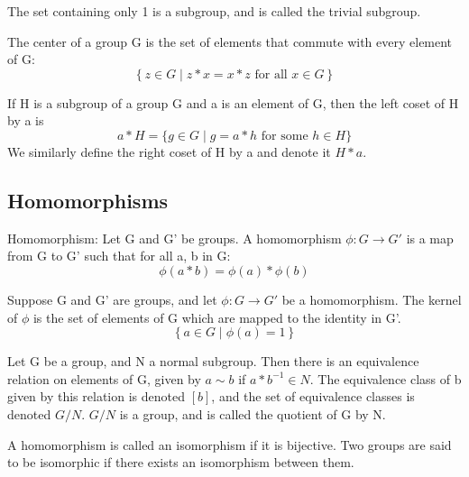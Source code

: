\documentclass[runningheads,a4paper]{llncs}
\renewcommand{\-}{\setminus}
\begin{document}
\begin{definition} The set containing only 1 is a subgroup, and is called the trivial subgroup.
\end{definition}

\begin{definition}[Center]
The center of a group G is the set of elements that commute with every element of G:
\[
\left\{ z \in G \mid z*x = x*z \text{ for all } x \in G \right\}
\]
\end{definition}

\begin{definition}
If H is a subgroup of a group G and a is an element of G, then the left coset of H by a is 
\[
a * H = \{ g \in G \mid g = a * h \text{ for some } h \in H \}
\]
We similarly define the right coset of H by a and denote it $H * a$.
\end{definition}

\subsection{Homomorphisms}

\begin{definition}[Homomorphism]
Homomorphism: Let G and G' be groups. A homomorphism $\phi : G \to G'$ is a map from G to G' such that for all a, b in G:
\[
\phi (a * b) = \phi(a) * \phi(b)
\]
\end{definition}

\begin{definition}[Kernel]
Suppose G and G' are groups, and let $\phi : G \to G'$ be a homomorphism. The kernel of $\phi$ is the set of elements of G which are mapped to the identity in G'.
\[
\left\{ a \in G \mid \phi(a) = 1 \right\}
\]
\end{definition}

\begin{definition}
Let G be a group, and N a normal subgroup. Then there is an equivalence relation on elements of G, given by $a \sim b$ if $a * b^{-1} \in N$. The equivalence class of b given by this relation is denoted $[b]$, and the set of equivalence classes is denoted $G/N$. $G/N$ is a group, and is called the quotient of G by N.
\end{definition}

\begin{definition}[Isomorphism]
A homomorphism is called an isomorphism if it is bijective. Two groups are said to be isomorphic if there exists an isomorphism between them.
\end{definition}
\end{document}
